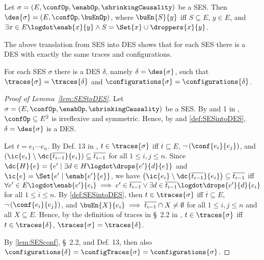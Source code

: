 \documentclass[runningheads,a4paper]{llncs}
\begin{document}
\begin{definition}
	\label{def:SESintoDES}
	Let $ \sigma = \left( E, \confOp, \enabOp, \shrinkingCausality \right) $ be a SES.
	Then $ \des{\sigma} = \left( E, \confOp, \buEnOp \right) $, where $ \buEn{S}{y} $ iff $ S \subseteq E $, $ y \in E $, and $ \exists x \in E \logdot \enab{x}{y} \land S = \Set{x} \cup \droppers{x}{y} $.
\end{definition}

The above translation from SES into DES shows that for each SES there is a DES with exactly the same traces and configurations.

\begin{lemma}
	\label{lem:SEStoDES}
	For each SES $ \sigma $ there is a DES $ \delta $, namely $ \delta = \des{\sigma} $, such that $ \traces{\sigma} = \traces{\delta} $ and $ \configurations{\sigma} = \configurations{\delta} $.
\end{lemma}

\begin{proof}[Proof  of Lemma~\ref{lem:SEStoDES}]
	Let $ \sigma = \left( E, \confOp, \enabOp, \shrinkingCausality \right) $ be a SES. By  and 1 in \cite{dynamicCausality15}, $ \confOp \subseteq E^2 $ is irreflexive and symmetric. Hence, by  and \ref{def:SESintoDES}, $ \delta = \des{\sigma} $ is a DES.
	
	Let $ t = e_1 \cdots e_n $.
	By Def. 13 in \cite{dynamicCausality15}, $ t \in \traces{\sigma} $ iff $ \overline{t} \subseteq E $, $ \neg \left( \conf{e_i}{e_j} \right) $, and $ ( \ic{e_i} \setminus \dc{\overline{t_{i - 1}}}{e_i} ) \subseteq \overline{t_{i - 1}} $ for all $ 1 \leq i, j \leq n $.
	Since $ \dc{H}{e} = \{ e' \mid \exists d \in H \logdot \drops{e'}{d}{e} \} $ and $ \ic{e} = \Set{ e' \mid \enab{e'}{e} } $, we have $ \left( \ic{e_i} \setminus \dc{\overline{t_{i - 1}}}{e_i} \right) \subseteq \overline{t_{i - 1}} $ iff $ \forall e' \in E \logdot \enab{e'}{e_i} \implies e' \in \overline{t_{i - 1}} \lor \exists d \in \overline{t_{i - 1}} \logdot \drops{e'}{d}{e_i} $ for all $ 1 \leq i \leq n $.
	By \ref{def:SESintoDES}, then $ t \in \traces{\sigma} $ iff $ \overline{t} \subseteq E $, $ \neg \left( \conf{e_i}{e_j} \right) $, and $ \buEn{X}{e_i} \implies \overline{t_{i - 1}} \cap X \neq \emptyset $ for all $ 1 \leq i, j \leq n $ and all $ X \subseteq E $.
	Hence, by the definition of traces in \S~2.2 in \cite{dynamicCausality15}, $ t \in
	\traces{\sigma} $ iff $ t \in \traces{\delta} $, \ie $ \traces{\sigma} = \traces{\delta} $.
	
	By \lem\ref{lem:SESconf}, \S~2.2, and Def. 13, then also $ \configurations{\delta} = \configTraces{\sigma} = \configurations{\sigma} $.
\end{proof}
\end{document}
